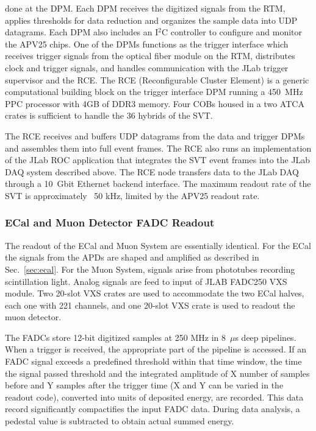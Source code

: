 done at the DPM.  Each DPM receives the digitized signals 
from the RTM, applies thresholds for data reduction and organizes the sample data 
into UDP datagrams. Each DPM also includes an I$^{2}$C controller to configure and monitor the 
APV25 chips. One of the DPMs functions as the trigger interface which receives trigger 
signals from the optical fiber module on the RTM, distributes clock and trigger signals, 
and handles communication with the JLab trigger supervisor and the RCE. The 
RCE (Reconfigurable Cluster Element) is a generic computational building block 
on the trigger interface DPM running a 450~MHz PPC processor with 4GB of DDR3 
memory. Four COBs housed in a two ATCA crates is sufficient to handle 
the 36 hybrids of the SVT.

The RCE receives and buffers UDP datagrams from the data and trigger DPMs and
 assembles them into full event frames. The RCE also runs an implementation of the JLab ROC application 
that integrates the SVT event frames into the JLab DAQ 
 system described above. The RCE node transfers data to the JLab DAQ  
 through a 10~Gbit Ethernet backend interface. The maximum readout rate of the SVT is approximately 
~50 kHz, limited by the APV25 readout rate. 








\subsubsection{ECal and Muon Detector FADC Readout}
\label{sec:fadc_daq}
The readout of the ECal and Muon System are essentially identical. For the ECal the signals from the APDs are 
shaped and amplified as described in Sec.~\ref{sec:ecal}. For the Muon System, signals arise from phototubes recording scintillation light.
Analog signals are feed to input of JLAB FADC250 VXS module. Two 20-slot VXS crates are used to accommodate the two ECal 
halves, each one with 221 channels, and one 20-slot VXS crate is used to readout the muon 
detector. 

The FADCs store 12-bit digitized samples at 250 MHz in 8~$\mu$s deep pipelines. 
When a trigger is received, the appropriate part of the pipeline is accessed. If an FADC   
signal exceeds a predefined threshold within that time window, the time the signal passed threshold and the integrated
amplitude of X number of samples before and Y samples after the trigger time (X and Y can be varied in the readout code), 
converted into units of deposited energy, are recorded. This data record significantly compactifies the  
input FADC data. During data analysis, a pedestal value is subtracted to obtain actual summed energy.

